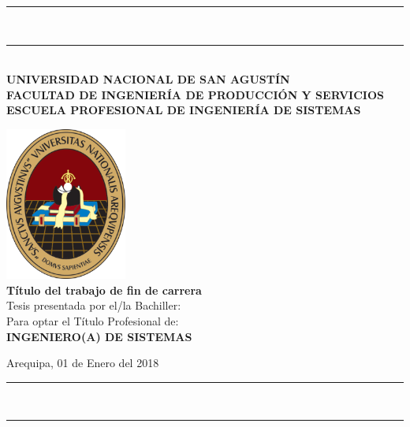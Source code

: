 \documentclass[12pt,oneside,a4paper]{book}
\begin{document}


\renewcommand*{\contentsname}{ÍNDICE DE CONTENIDO}
\renewcommand*{\listfigurename}{ÍNDICE DE FIGURAS}
\renewcommand*{\listtablename}{ÍNDICE DE TABLAS}


\thispagestyle{empty}
\begin{center}
  
\rule{\textwidth}{3pt} \\
\vspace{-0.38cm}
\rule{\textwidth}{1pt} \\
\vspace{0.5cm}
\Large{\textbf{UNIVERSIDAD NACIONAL DE SAN AGUSTÍN}} \\ \vspace{0.2cm}
\large{\textbf{FACULTAD DE INGENIERÍA DE PRODUCCIÓN Y SERVICIOS}} \\ \vspace{0.2cm}
\large{\textbf{ESCUELA PROFESIONAL DE INGENIERÍA DE SISTEMAS}} \vspace{1.5cm}
  
    \includegraphics[width=0.3\textwidth]{logotipo} \\
    \vspace*{1.5cm}
     \textbf{\Large{Título del trabajo de fin de carrera}}\\
     \vspace*{1cm}
     \Large{Tesis presentada por el/la Bachiller:\\}
     \Large{\textbf{}}
%    
     \vskip 1cm
     \Large{Para optar el Título Profesional de:}\\
     \LARGE{\textbf{INGENIERO(A) DE SISTEMAS}}
    \vskip 1cm
% 
    
    \vskip 2cm
    \large{Arequipa, 01 de Enero del 2018}\\
\rule{\textwidth}{1pt}\\
\vspace{-0.32cm}    
\rule{\textwidth}{3pt}
\end{center}
\end{document}
